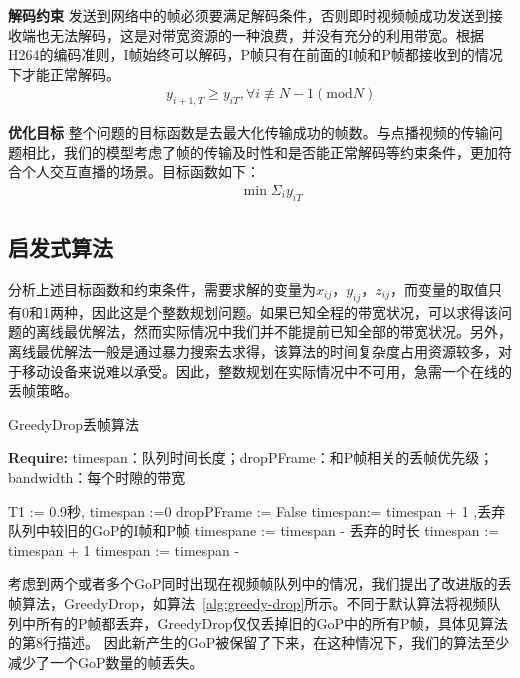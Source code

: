 \textbf{解码约束} 发送到网络中的帧必须要满足解码条件，否则即时视频帧成功发送到接收端也无法解码，这是对带宽资源的一种浪费，并没有充分的利用带宽。根据H264的编码准则，I帧始终可以解码，P帧只有在前面的I帧和P帧都接收到的情况下才能正常解码。
\begin{eqnarray}
  && y_{i+1,T} \geq y_{iT}, \forall i \not\equiv N-1 (\text{mod}N)
\end{eqnarray}

\textbf{优化目标} 整个问题的目标函数是去最大化传输成功的帧数。与点播视频的传输问题相比，我们的模型考虑了帧的传输及时性和是否能正常解码等约束条件，更加符合个人交互直播的场景。目标函数如下：
\begin{eqnarray}
  && \min \Sigma_i {y_{iT}}
\end{eqnarray}

\subsection{启发式算法}
分析上述目标函数和约束条件，需要求解的变量为$x_{ij}$，$y_{ij}$，$z_{ij}$，而变量的取值只有0和1两种，因此这是个整数规划问题。如果已知全程的带宽状况，可以求得该问题的离线最优解法，然而实际情况中我们并不能提前已知全部的带宽状况。另外，离线最优解法一般是通过暴力搜索去求得，该算法的时间复杂度占用资源较多，对于移动设备来说难以承受。因此，整数规划在实际情况中不可用，急需一个在线的丢帧策略。

\begin{algorithm}[htb]
\caption{GreedyDrop丢帧算法}
\label{alg:greedy-drop}
{\bf Require:} timespan：队列时间长度；dropPFrame：和P帧相关的丢帧优先级；bandwidth：每个时隙的带宽
\begin{algorithmic}[1]
\State T1 := 0.9秒, timespan :=0
\State dropPFrame := False
\State {}
\State timespan:= timespan + 1
\EndIf
{}
\State {},丢弃队列中较旧的GoP的I帧和P帧
\State timespane := timespan - 丢弃的时长
\Else
\State {}
\State timespan := timespan + 1
\EndIf
\EndIf
\State timespan := timespan - 
\end{algorithmic}
\end{algorithm}

考虑到两个或者多个GoP同时出现在视频帧队列中的情况，我们提出了改进版的丢帧算法，GreedyDrop，如算法~\ref{alg:greedy-drop}所示。不同于默认算法将视频队列中所有的P帧都丢弃，GreedyDrop仅仅丢掉旧的GoP中的所有P帧，具体见算法的第8行描述。 因此新产生的GoP被保留了下来，在这种情况下，我们的算法至少减少了一个GoP数量的帧丢失。

